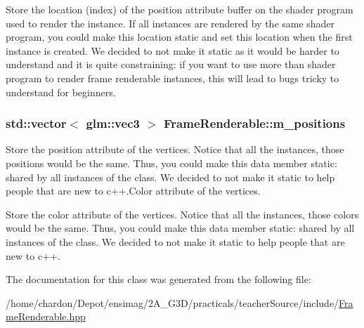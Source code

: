 Store the location (index) of the position attribute buffer on the shader program used to render the instance. If all instances are rendered by the same shader program, you could make this location static and set this location when the first instance is created. We decided to not make it static as it would be harder to understand and it is quite constraining\+: if you want to use more than shader program to render frame renderable instances, this will lead to bugs tricky to understand for beginners. \hypertarget{classFrameRenderable_a6cb58f4ca3a0198e628da450f2a4c731}{
\subsubsection[{m\+\_\+positions}]{\setlength{\rightskip}{0pt plus 5cm}std\+::vector$<$ glm\+::vec3 $>$ Frame\+Renderable\+::m\+\_\+positions\hspace{0.3cm}{\ttfamily [private]}}}\label{classFrameRenderable_a6cb58f4ca3a0198e628da450f2a4c731}
Store the position attribute of the vertices. Notice that all the instances, those positions would be the same. Thus, you could make this data member static\+: shared by all instances of the class. We decided to not make it static to help people that are new to c++.Color attribute of the vertices.

Store the color attribute of the vertices. Notice that all the instances, those colors would be the same. Thus, you could make this data member static\+: shared by all instances of the class. We decided to not make it static to help people that are new to c++. 

The documentation for this class was generated from the following file\+:\begin{DoxyCompactItemize}
\item 
/home/chardon/\+Depot/ensimag/2\+A\+\_\+\+G3\+D/practicals/teacher\+Source/include/\hyperlink{FrameRenderable_8hpp}{Frame\+Renderable.\+hpp}\end{DoxyCompactItemize}
